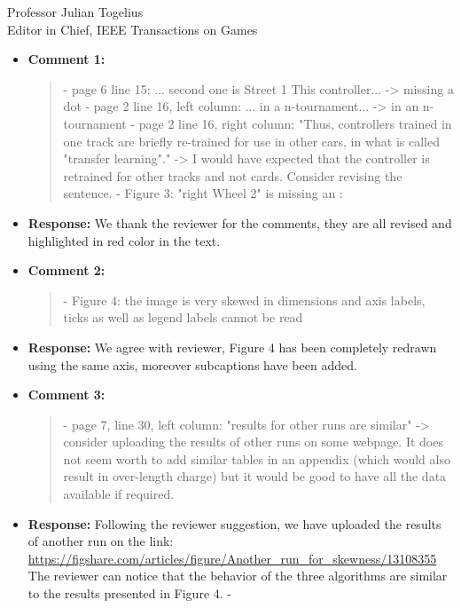 \documentclass[10pt]{letter} %
\begin{document}
\begin{letter}{Professor Julian Togelius \\ Editor in Chief, IEEE Transactions on Games}
\begin{enumerate}
		\begin{itemize}
			\item {\bf Comment 1:}
				\begin{quote}
					- page 6 line 15: ... second one is Street 1 This controller... -> missing a dot
					- page 2 line 16, left column: ... in a n-tournament... -> in an n-tournament
					- page 2 line 16, right column: "Thus, controllers trained in one track are briefly re-trained for use in other cars, in what is called "transfer learning"." -> I would have expected that the controller is retrained for other tracks and not cards. Consider revising the sentence.
					- Figure 3: "right Wheel 2" is missing an :
				\end{quote}	
			\item {\bf Response:} 
					We thank the reviewer for the comments, they are all revised and highlighted in red color in the text.
			\item {\bf Comment 2:}
				\begin{quote}
					- Figure 4: the image is very skewed in dimensions and axis labels, ticks as well as legend labels cannot be read
				\end{quote}	
			\item {\bf Response:} 
				We agree with reviewer, Figure 4 has been completely redrawn using the same axis, moreover subcaptions have been added. 
			\item {\bf Comment 3:}
				\begin{quote}
					- page 7, line 30, left column: "results for other runs are similar" -> consider uploading the results of other runs on some webpage. It does not seem worth to add similar tables in an appendix (which would also result in over-length charge) but it would be good to have all the data available if required.
				\end{quote}	
			\item {\bf Response:} 
				Following the reviewer suggestion, we have uploaded  the results of another run on the link:\\
			\url{	https://figshare.com/articles/figure/Another\_run\_for\_skewness/13108355}\\
			The reviewer can notice that the behavior of the three algorithms are similar to the results presented in Figure 4.
		-
	   \end{itemize}


\end{enumerate}
\end{letter}
\end{document}

